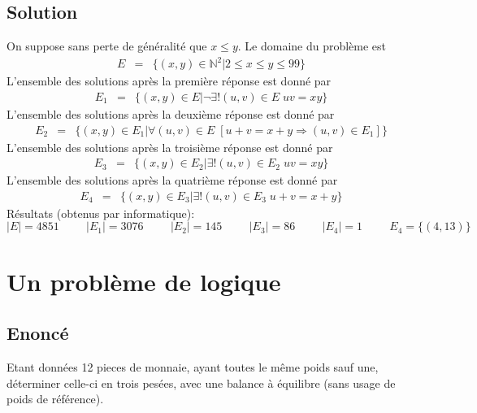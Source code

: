 \documentclass{article}
\begin{document}
\subsection{Solution}
On suppose sans perte de généralité que $x\leq y$. Le domaine du problème est
\begin{eqnarray*}
E & = & \{(x,y)\in\mathbb{N}^2|2\leq x\leq y\leq 99\}
\end{eqnarray*}
L'ensemble des solutions après la première réponse est donné par
\begin{eqnarray*}
E_1 & = & \{(x,y)\in E|\neg \exists! (u,v)\in E\;uv=xy\}
\end{eqnarray*}
L'ensemble des solutions après la deuxième réponse est donné par
\begin{eqnarray*}
E_2 & = & \{(x,y)\in E_1|\forall(u,v)\in E\;[u+v=x+y\Rightarrow(u,v)\in E_1]\}
\end{eqnarray*}
L'ensemble des solutions après la troisième réponse est donné par
\begin{eqnarray*}
E_3 & = & \{(x,y)\in E_2|\exists! (u,v)\in E_2\;uv=xy\}
\end{eqnarray*}
L'ensemble des solutions après la quatrième réponse est donné par
\begin{eqnarray*}
E_4 & = & \{(x,y)\in E_3|\exists! (u,v)\in E_3\;u+v=x+y\}
\end{eqnarray*}
Résultats (obtenus par informatique):
\[
|E| = 4851
\hspace{1cm}
|E_1| = 3076
\hspace{1cm}
|E_2| = 145
\hspace{1cm}
|E_3| = 86
\hspace{1cm}
|E_4| = 1
\hspace{1cm}
E_4 = \{(4,13)\}
\]
\pagebreak

\section{Un problème de logique}

\subsection{Enoncé}
Etant données 12 pieces de monnaie, ayant toutes le même poids sauf une, déterminer celle-ci en trois pesées, avec une balance à équilibre (sans usage de poids de référence).
\end{document}
